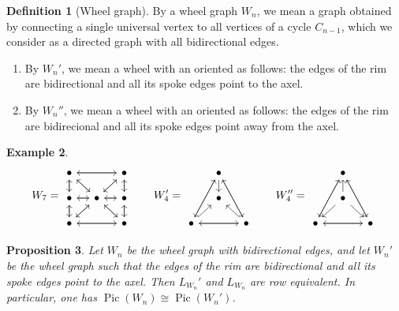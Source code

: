 \documentclass[11pt,reqno]{amsart}
\DeclareMathOperator{\Pic}{Pic}
\theoremstyle{definition}
\newtheorem{mydef}{Definition}[section]
\newtheorem{myeg}[mydef]{Example}
\theoremstyle{plain}
\newtheorem{proposition}[mydef]{Proposition}
\begin{document}
\begin{mydef}[{Wheel graph}]
By a wheel graph $W_n$, we mean a graph obtained by connecting a single universal vertex to all vertices of a cycle $C_{n-1}$, which we consider as a directed graph with all bidirectional edges. 
\begin{enumerate}
	\item 
By $W_n'$, we mean a wheel with an oriented as follows: the edges of the rim are bidirectional and all its spoke edges point to the axel.
\item 
By $W_n''$, we mean a wheel with an oriented as follows: the edges of the rim are bidirecional and all its spoke edges point away from the axel.
\end{enumerate}
\end{mydef}



\begin{myeg}\label{example: wheel graph orientations}
\[
W_7=\begin{tikzcd}[row sep=0.4cm, column sep=0.4cm]
	\bullet \arrow[dr] \arrow[d]\arrow[rr]& &\bullet \arrow[d] \arrow[ll] \arrow[dl]\\
	\bullet \arrow[r]\arrow[u]\arrow[d]& \bullet \arrow[l] \arrow[ru] \arrow[lu] \arrow[dl] \arrow[dr] \arrow[r]& \bullet\arrow[d] \arrow[l] \arrow[u]\\
	\bullet \arrow[rr] \arrow[u] \arrow[ru] & &\bullet \arrow[u] \arrow[ul] \arrow[ll]
\end{tikzcd} \qquad W_4'=\begin{tikzcd}[row sep=0.4cm, column sep=0.4cm]
	& \bullet  \arrow[ldd] \arrow[rdd] \arrow[d] & \\
	& \bullet & \\
	\bullet \arrow[ru]\arrow[rr] \arrow[ruu] & & \bullet \arrow[lu] \arrow[luu] \arrow[ll]
\end{tikzcd} \qquad W_4''=\begin{tikzcd}[row sep=0.4cm, column sep=0.4cm]
& \bullet  \arrow[ldd] \arrow[rdd]  & \\
& \bullet \arrow[u] \arrow[dl] \arrow[dr] & \\
\bullet \arrow[rr] \arrow[ruu] & & \bullet  \arrow[luu] \arrow[ll]
\end{tikzcd}
\]
\end{myeg}

\begin{proposition}\label{proposition: wheel1}
Let $W_n$ be the wheel graph with bidirectional edges, and let $W_n'$ be the wheel graph such that the edges of the rim are bidirectional and all its spoke edges point to the axel. 
Then $L_{W_n}'$ and $L_{W_n}$ are row equivalent. In particular, one has $\Pic (W_n) \cong \Pic (W_n')$.
\end{proposition}
\end{document}
